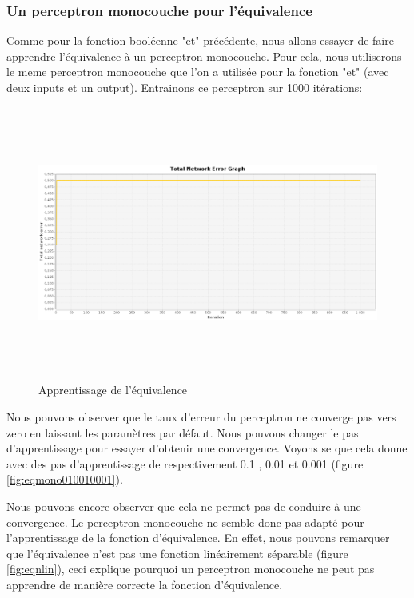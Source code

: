 \documentclass[twoside,openright,a4paper,11pt,french]{article}
\begin{document}
\subsubsection{Un perceptron monocouche pour l'équivalence}

Comme pour la fonction booléenne "et" précédente, nous allons essayer de faire
apprendre l'équivalence à un perceptron monocouche. Pour cela, nous utiliserons le meme
perceptron monocouche que l'on a utilisée pour la fonction "et" (avec deux inputs
et un output). Entrainons ce perceptron sur 1000 itérations:

\begin{figure}[ht]
\centering
\includegraphics[width=12cm,height=9cm]{./pics/eq/mono_eq_def.eps}
\caption{Apprentissage de l'équivalence}
\end{figure}

Nous pouvons observer que le taux d'erreur du perceptron ne converge pas vers
zero en laissant les paramètres par défaut. Nous pouvons changer le pas
d'apprentissage pour essayer d'obtenir une convergence.
Voyons se que cela donne avec des pas d'apprentissage de respectivement 0.1 ,
0.01 et 0.001 (figure \ref{fig:eqmono010010001}).

Nous pouvons encore observer que cela ne permet pas de conduire à une convergence.
Le perceptron monocouche ne semble donc pas adapté pour l'apprentissage de la fonction
d'équivalence. En effet, nous pouvons remarquer que l'équivalence n'est pas une fonction
linéairement séparable (figure \ref{fig:eqnlin}), ceci explique pourquoi un
perceptron monocouche ne peut pas apprendre de manière correcte la fonction
d'équivalence.
\end{document}
